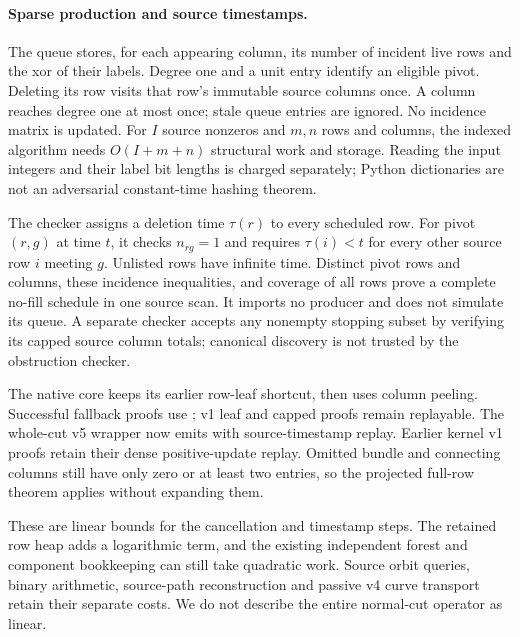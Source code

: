 \paragraph{Sparse production and source timestamps.}
The queue stores, for each appearing column, its number of incident live
rows and the xor of their labels. Degree one and a unit entry identify an
eligible pivot. Deleting its row visits that row's immutable source columns
once. A column reaches degree one at most once; stale queue entries are
ignored. No incidence matrix is updated. For $I$ source nonzeros and $m,n$
rows and columns, the indexed algorithm needs $O(I+m+n)$ structural work
and storage. Reading the input integers and their label bit lengths is
charged separately; Python dictionaries are not an adversarial constant-time
hashing theorem.

The checker assigns a deletion time $\tau(r)$ to every scheduled row. For
pivot $(r,g)$ at time $t$, it checks $n_{rg}=1$ and requires
$\tau(i)<t$ for every other source row $i$ meeting $g$. Unlisted rows have
infinite time. Distinct pivot rows and columns, these incidence inequalities,
and coverage of all rows prove a complete no-fill schedule in one source
scan. It imports no producer and does not simulate its queue. A separate
checker accepts any nonempty stopping subset by verifying its capped source
column totals; canonical discovery is not trusted by the obstruction checker.

The native core keeps its earlier row-leaf shortcut, then uses column peeling.
Successful fallback proofs use ; v1 leaf and
capped proofs remain replayable. The whole-cut v5 wrapper now emits
 with source-timestamp replay. Earlier kernel
v1 proofs retain their dense positive-update replay. Omitted bundle and
connecting columns still have only zero or at least two entries, so the
projected full-row theorem applies without expanding them.

These are linear bounds for the cancellation and timestamp steps. The
retained row heap adds a logarithmic term, and the existing independent
forest and component bookkeeping can still take quadratic work. Source
orbit queries, binary arithmetic, source-path reconstruction and passive
v4 curve transport retain their separate costs. We do not describe the
entire normal-cut operator as linear.

